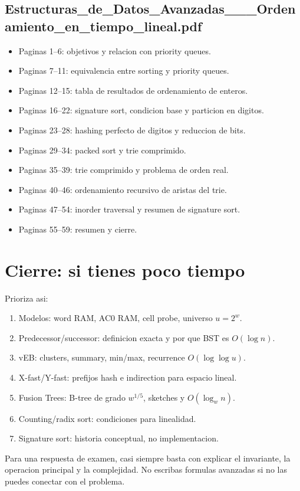 \documentclass[10pt]{article}
\newcommand{\bigO}{O}
\begin{document}
\subsection*{Estructuras\_de\_Datos\_Avanzadas\_\_\_Ordenamiento\_en\_tiempo\_lineal.pdf}
\begin{itemize}[leftmargin=*]
\item Paginas 1--6: objetivos y relacion con priority queues.
\item Paginas 7--11: equivalencia entre sorting y priority queues.
\item Paginas 12--15: tabla de resultados de ordenamiento de enteros.
\item Paginas 16--22: signature sort, condicion base y particion en digitos.
\item Paginas 23--28: hashing perfecto de digitos y reduccion de bits.
\item Paginas 29--34: packed sort y trie comprimido.
\item Paginas 35--39: trie comprimido y problema de orden real.
\item Paginas 40--46: ordenamiento recursivo de aristas del trie.
\item Paginas 47--54: inorder traversal y resumen de signature sort.
\item Paginas 55--59: resumen y cierre.
\end{itemize}



\section*{Cierre: si tienes poco tiempo}
Prioriza asi:
\begin{enumerate}[leftmargin=*]
\item Modelos: word RAM, AC0 RAM, cell probe, universo $u=2^w$.
\item Predecessor/successor: definicion exacta y por que BST es $\bigO(\log n)$.
\item vEB: clusters, summary, min/max, recurrence $\bigO(\log\log u)$.
\item X-fast/Y-fast: prefijos hash e indirection para espacio lineal.
\item Fusion Trees: B-tree de grado $w^{1/5}$, sketches y $\bigO(\log_w n)$.
\item Counting/radix sort: condiciones para linealidad.
\item Signature sort: historia conceptual, no implementacion.
\end{enumerate}

Para una respuesta de examen, casi siempre basta con explicar el invariante, la
operacion principal y la complejidad. No escribas formulas avanzadas si no las
puedes conectar con el problema.
\end{document}
